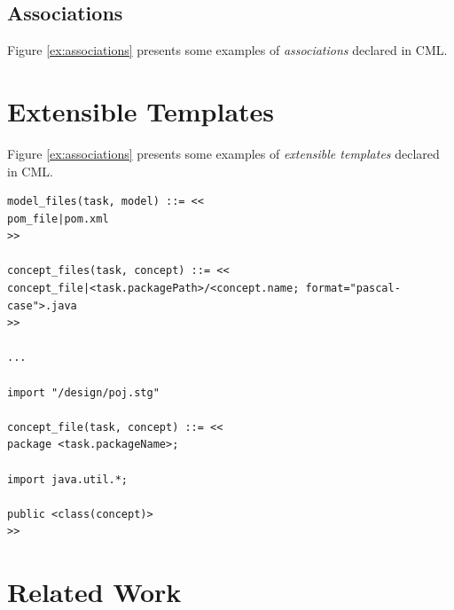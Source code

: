 \documentclass[a0,portrait]{a0poster}
\makeatletter
\newcommand{\verbatimfont}[1]{\renewcommand{\verbatim@font}{\ttfamily#1}}
\makeatother
\begin{document}
\begin{multicols}{3}
\subsection*{Associations}

Figure \ref{ex:associations} presents some examples of \emph{associations} declared in CML.

\begin{center}
\verbatimfont{\small}

\label{ex:associations}
\end{center}


\section*{Extensible Templates}

Figure \ref{ex:associations} presents some examples of
\emph{extensible templates} declared in CML.

\begin{center}
\verbatimfont{\scriptsize}
\begin{verbatim}
model_files(task, model) ::= <<
pom_file|pom.xml
>>

concept_files(task, concept) ::= <<
concept_file|<task.packagePath>/<concept.name; format="pascal-case">.java
>>

...

import "/design/poj.stg"

concept_file(task, concept) ::= <<
package <task.packageName>;

import java.util.*;

public <class(concept)>
>>
\end{verbatim}
\label{ex:templates1}
\end{center}


\color{SaddleBrown} %

\section*{Related Work}


\end{multicols}
\end{document}
